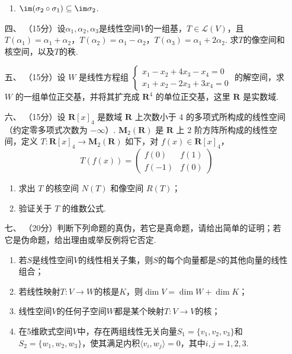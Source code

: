 \begin{enumerate}
\begin{enumerate}[label=(\arabic*)]
        \item $\im(\sigma_2\circ\sigma_1)\subseteq\im\sigma_2$.
    \end{enumerate}
	\item[四、]（15分）设$\alpha_1,\alpha_2,\alpha_3$是线性空间$V$的一组基，$T\in\mathcal{L}(V)$，且$T(\alpha_1)=\alpha_1+\alpha_2$，$T(\alpha_2)=\alpha_1-\alpha_2$，$T(\alpha_3)=\alpha_1+2\alpha_2$. 求$T$的像空间和核空间，以及$T$的秩.
	\item[五、]（15分）设 $W$ 是线性方程组 $\begin{cases}
        x_1-x_2+4x_3-x_4=0 \\ x_1+x_2-2x_3+3x_4=0
    \end{cases}$ 的解空间，求 $W$ 的一组单位正交基，并将其扩充成 $\mathbf{R}^4$ 的单位正交基，这里 $\mathbf{R}$ 是实数域.
	\item[六、]（15分）设 $\mathbf{R}[x]_4$ 是数域 $\mathbf{R}$ 上次数小于 4 的多项式所构成的线性空间（约定零多项式次数为 $-\infty$）. $\mathbf{M}_2(\mathbf{R})$ 是 $\mathbf{R}$ 上 2 阶方阵所构成的线性空间，定义 $T : \mathbf{R}[x]_4 \to \mathbf{M}_2(\mathbf{R})$ 如下，对 $f(x) \in \mathbf{R}[x]_4$，
    \[T(f(x))=\begin{pmatrix}f(0) & f(1) \\ f(-1) & f(0)\end{pmatrix}\]
    \begin{enumerate}
        \item 求出 $T$ 的核空间 $N(T)$ 和像空间 $R(T)$；

        \item 验证关于 $T$ 的维数公式.
    \end{enumerate}
	\item[七、]（20分）判断下列命题的真伪，若它是真命题，请给出简单的证明；若它是伪命题，给出理由或举反例将它否定.
	\begin{enumerate}[label=(\arabic*)]
        \item 若$S$是线性空间$V$的线性相关子集，则$S$的每个向量都是$S$的其他向量的线性组合；

        \item 若线性映射$T:V\to W$的核是$K$，则$\dim V=\dim W+\dim K$；

        \item 线性空间$V$的任何子空间$W$都是某个映射$T:V\to V$的核；

        \item 在5维欧式空间$V$中，存在两组线性无关向量$S_1=\{v_1,v_2,v_3\}$和$S_2=\{w_1,w_2,w_3\}$，使其满足内积$\langle v_i,w_j\rangle=0$，其中$i,j=1,2,3$.
    \end{enumerate}
\end{enumerate}

\clearpage

